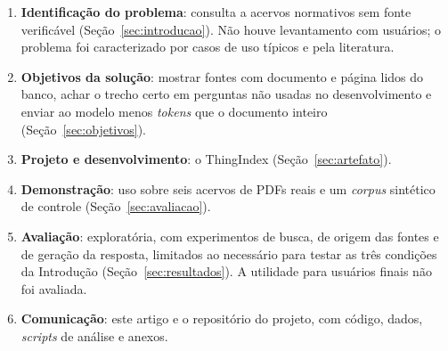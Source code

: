 \documentclass[12pt]{article}
\begin{document}
\begin{enumerate}
  \item \textbf{Identificação do problema}: consulta a acervos normativos sem fonte verificável (Seção~\ref{sec:introducao}). Não houve levantamento com usuários; o problema foi caracterizado por casos de uso típicos e pela literatura.
  \item \textbf{Objetivos da solução}: mostrar fontes com documento e página lidos do banco, achar o trecho certo em perguntas não usadas no desenvolvimento e enviar ao modelo menos \emph{tokens} que o documento inteiro (Seção~\ref{sec:objetivos}).
  \item \textbf{Projeto e desenvolvimento}: o ThingIndex (Seção~\ref{sec:artefato}).
  \item \textbf{Demonstração}: uso sobre seis acervos de PDFs reais e um \emph{corpus} sintético de controle (Seção~\ref{sec:avaliacao}).
  \item \textbf{Avaliação}: exploratória, com experimentos de busca, de origem das fontes e de geração da resposta, limitados ao necessário para testar as três condições da Introdução (Seção~\ref{sec:resultados}). A utilidade para usuários finais não foi avaliada.
  \item \textbf{Comunicação}: este artigo e o repositório do projeto, com código, dados, \emph{scripts} de análise e anexos.
\end{enumerate}
\end{document}
